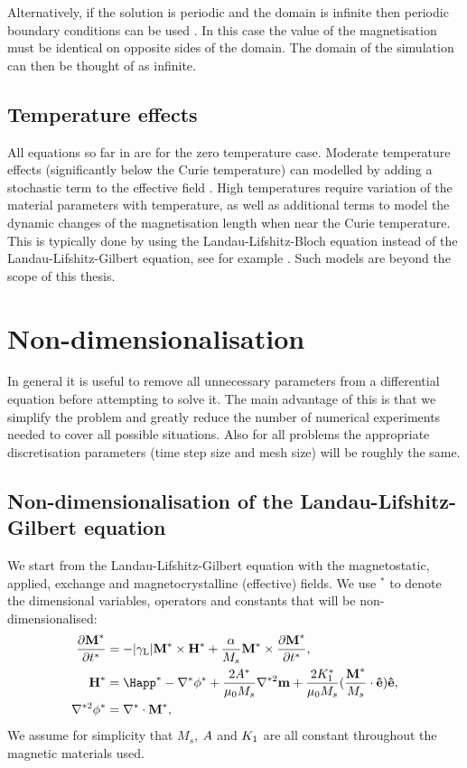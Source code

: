 Alternatively, if the solution is periodic and the domain is infinite then periodic boundary conditions can be used \cite{Jeong2010}.
In this case the value of the magnetisation must be identical on opposite sides of the domain.
The domain of the simulation can then be thought of as infinite.

\subsection{Temperature effects}
\label{sec:temperature-effects}

All equations so far in  are for the zero temperature case.
Moderate temperature effects (significantly below the Curie temperature) can modelled by adding a stochastic term to the effective field \cite{DAquino2006}.
High temperatures require variation of the material parameters with temperature, as well as additional terms to model the dynamic changes of the magnetisation length when near the Curie temperature.
This is typically done by using the Landau-Lifshitz-Bloch equation instead of the Landau-Lifshitz-Gilbert equation, see for example \cite{Evans2012}.
Such models are beyond the scope of this thesis.


\section{Non-dimensionalisation}
\label{sec:normalisations-appendix}

In general it is useful to remove all unnecessary parameters from a differential equation before attempting to solve it.
The main advantage of this is that we simplify the problem and greatly reduce the number of numerical experiments needed to cover all possible situations.
Also for all problems the appropriate discretisation parameters (time step size and mesh size) will be roughly the same.

\subsection{Non-dimensionalisation of the Landau-Lifshitz-Gilbert equation}
\label{sec:land-lifsh-gilb-normalisation}

We start from the Landau-Lifshitz-Gilbert equation with the magnetostatic, applied, exchange and magnetocrystalline (effective) fields. We use $^*$ to denote the dimensional variables, operators and constants that will be non-dimensionalised:
\begin{align}
  \pd{\Mv^*}{t^*} &= - \gymagc \Mv^* \times \Hv^* + \frac{\alpha}{M_s} \Mv^* \times \pd{\Mv^*}{t^*},
                    \label{eqn:llgnd} \\
  \Hv^* &= \Happ^* - \grad^* \phi^* + \frac{2\Exchc^*}{\mu_0 M_s} \nabla^{*2} \mv + \frac{2\Kone^*}{\mu_0 M_s} (\frac{\Mv^*}{M_s} \cdot \ev) \ev,
          \label{eqn:effnd} \\
  \nabla^{*2} \phi^* &= \grad^* \cdot \Mv^*,
                       \label{eqn:phind}
\end{align}
We assume for simplicity that $M_s$, $A$ and $K_1$ are all
constant throughout the magnetic materials used.

